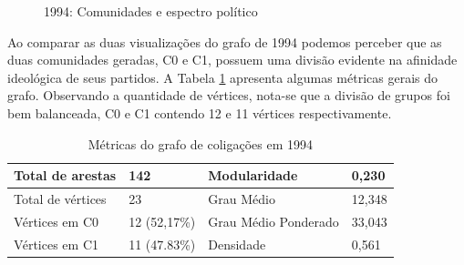 \begin{figure}[H]
\center
    \qquad
    
    \caption{1994: Comunidades e espectro político}
\end{figure}

Ao comparar as duas visualizações do grafo de 1994 podemos perceber que as duas comunidades geradas, C0 e C1, possuem uma divisão evidente na afinidade ideológica de seus partidos. A Tabela \ref{table-1994} apresenta algumas métricas gerais do grafo. Observando a quantidade de vértices, nota-se que a divisão de grupos foi bem balanceada, C0 e C1 contendo 12 e 11 vértices respectivamente.

\begin{table}[H]
\centering
\label{table-1994}
\begin{tabular}{|l|l|l|l|}
\hline
Total de arestas  & 142 & Modularidade         & 0,230 \\ \hline
Total de vértices & 23   & Grau Médio           & 12,348 \\ \hline
Vértices em C0    & 12 (52,17\%)  & Grau Médio Ponderado & 33,043 \\ \hline
Vértices em C1    & 11 (47.83\%) & Densidade            &  0,561\\ \hline
\end{tabular}
\caption{Métricas do grafo de coligações em 1994}
\end{table}

